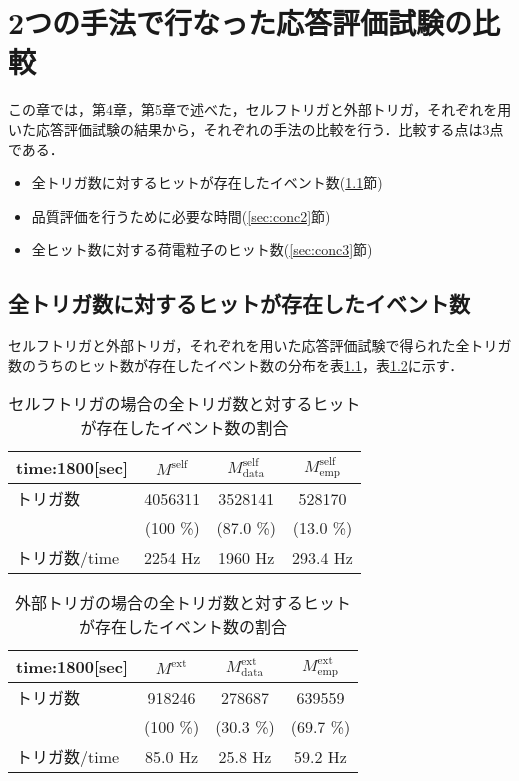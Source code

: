 \chapter{2つの手法で行なった応答評価試験の比較}
この章では，第4章，第5章で述べた，セルフトリガと外部トリガ，それぞれを用いた応答評価試験の結果から，それぞれの手法の比較を行う．比較する点は3点である．
\begin{itemize}
\item 全トリガ数に対するヒットが存在したイベント数(\ref{sec:conc1}節)
\item 品質評価を行うために必要な時間(\ref{sec:conc2}節)
\item 全ヒット数に対する荷電粒子のヒット数(\ref{sec:conc3}節)
\end{itemize}


\section{全トリガ数に対するヒットが存在したイベント数}
\label{sec:conc1}
セルフトリガと外部トリガ，それぞれを用いた応答評価試験で得られた全トリガ数のうちのヒット数が存在したイベント数の分布を表\ref{tab:selfrcomp}，表\ref{tab:extrcomp}に示す．

\begin{table}[h]
  \centering
  \caption{セルフトリガの場合の全トリガ数と対するヒットが存在したイベント数の割合}
  \begin{tabular} {l|ccc} \hline
    time:1800[sec] & $M^{\mathrm{self}}$ & $M_{\mathrm{data}}^{\mathrm{self}}$ & $M_{\mathrm{emp}}^{\mathrm{self}}$ \\ \hline \hline
    トリガ数 & 4056311 & 3528141 & 528170 \\
     & (100 \%) & (87.0 \%) & (13.0 \%) \\ \hline
    トリガ数/time & 2254 $\mathrm{Hz}$ & 1960 $\mathrm{Hz}$ & 293.4 $\mathrm{Hz}$ \\ \hline
  \end{tabular}
  \label{tab:selfrcomp}
\end{table}

\begin{table}[h]
  \centering
  \caption{外部トリガの場合の全トリガ数と対するヒットが存在したイベント数の割合}
  \begin{tabular} {l|ccc} \hline
    time:1800[sec] & $M^{\mathrm{ext}}$ & $M_{\mathrm{data}}^{\mathrm{ext}}$ & $M_{\mathrm{emp}}^{\mathrm{ext}}$ \\ \hline \hline
    トリガ数 & 918246 & 278687 & 639559 \\
     & (100 \%) & (30.3 \%) & (69.7 \%) \\ \hline
    トリガ数/time & 85.0 $\mathrm{Hz}$ & 25.8 $\mathrm{Hz}$ & 59.2 $\mathrm{Hz}$ \\ \hline
  \end{tabular}
  \label{tab:extrcomp}
\end{table}

